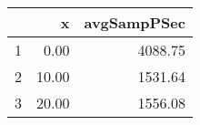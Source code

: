 \begin{table}[h]
\centering
\begin{tabular}{rrr}
  \hline
 & x & avgSampPSec \\ 
  \hline
1 & 0.00 & 4088.75 \\ 
   \hline
2 & 10.00 & 1531.64 \\ 
   \hline
3 & 20.00 & 1556.08 \\ 
   \hline
\end{tabular}
\end{table}
